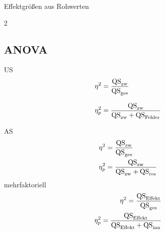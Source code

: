 \begin{formulaBox}{Effektgrößen aus Rohwerten}{}
\begin{multicols}{2}
\subsection*{ANOVA}

US
\begin{align*}
\eta^2 &= \frac{\mathrm{QS}_{\mathrm{zw}}}{\mathrm{QS}_{\mathrm{ges}}} \\[0.7em]
\eta^2_{p} &= \frac{\mathrm{QS}_{\mathrm{zw}}}{\mathrm{QS}_{\mathrm{zw}}+\mathrm{QS}_{\mathrm{Fehler}}}
\end{align*}

AS
\begin{align*}
\eta^2&=\frac{\mathrm{QS}_{\mathrm{zw}}}{\mathrm{QS}_{\mathrm{ges}}}\\
\eta^2_p&=\frac{\mathrm{QS}_{\mathrm{zw}}}{\mathrm{QS}_{\mathrm{zw}}+\mathrm{QS}_{\mathrm{res}}}\\
\end{align*}
mehrfaktoriell
\begin{align*}
\eta^2=\frac{\mathrm{QS}_{\mathrm{Effekt}}}{\mathrm{QS}_{\mathrm{ges}}}\\
\eta^2_p=\frac{\mathrm{QS}_{\mathrm{Effekt}}}{\mathrm{QS}_{\mathrm{Effekt}}+\mathrm{QS}_{\mathrm{inn}}}\\
\end{align*}

\end{multicols}
\end{formulaBox}

